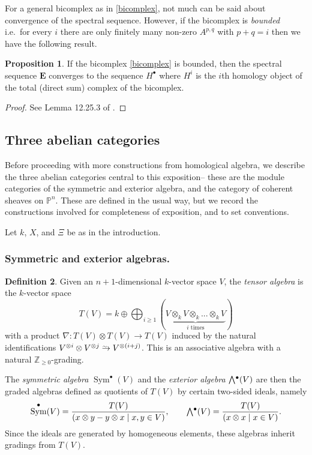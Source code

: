 \documentclass[a4paper]{article}
\theoremstyle{definition}
\newtheorem{defn}{Definition}[section]
\newtheorem{prop}[defn]{Proposition}
\theoremstyle{remark}
\newcommand{\simrightarrow}{\mathrel{\ooalign{
     $\to$\cr
     \hidewidth\raise.3em\hbox{$\scaleobj{.7}{\sim}\mkern7mu$}\cr
    }
  }
}
\newcommand{\Exter}{\mathchoice{{\textstyle\bigwedge}}%
    {{\bigwedge}}%
    {{\textstyle\wedge}}%
    {{\scriptstyle\wedge}}}
\DeclareMathOperator{\Sym}{\text{Sym}}
\DeclareMathOperator{\exterior}{\Exter^\bullet}
\newcommand{\Pn}{\ensuremath{{\mathbb{P}^n}}}
\begin{document}
For a general bicomplex as in \eqref{bicomplex}, not much can be said about
convergence of the spectral sequence. However, if the bicomplex is
\textit{bounded} i.e.\ for every \(i\) there are only finitely many non-zero
\(A^{p,q}\) with \(p+q=i\) then we have the following result.
\pagebreak

\begin{prop}\label{spectral-convergence}
    If the bicomplex \eqref{bicomplex} is bounded, then the spectral sequence
    \(\mathbf{E}\) converges to the sequence \(H^\bullet\) where \(H^i\) is the
    \(i\)th homology object of the total (direct sum) complex of the bicomplex.
    \begin{proof}
        See Lemma 12.25.3 of .
    \end{proof}
\end{prop}

\subsection{Three abelian categories}

Before proceeding with more constructions from homological algebra, we describe
the three abelian categories central to this exposition-- these are the module
categories of the symmetric and exterior algebra, and the category of coherent
sheaves on \(\Pn\). These are defined in the usual way, but we record the
constructions involved for completeness of exposition, and to set conventions. 

Let \(k\), \(X\), and \(\Xi\) be as in the introduction.

\subsubsection{Symmetric and exterior algebras.} 

\begin{defn} 
    Given an \(n+1\)-dimensional \(k\)-vector space \(V\), the \textit{tensor
    algebra} is the \(k\)-vector space 
    \[ T(V) = k \oplus \bigoplus_{i\geq 1}(\underbrace{V\otimes_k V\otimes_k ...
    \otimes_k V}_{i\text{ times}})\] 
    with a product \(\nabla: T(V)\otimes T(V) \rightarrow T(V)\) induced by the
    natural identifications \(V^{\otimes i}\otimes V^{\otimes j} \simrightarrow
    V^{\otimes(i+j)}\). This is an associative algebra with a natural
    \(\mathbb{Z}_{\geq 0}\)-grading. 

    The \textit{symmetric algebra} \(\Sym^\bullet(V)\) and the \textit{exterior
    algebra} \(\exterior(V)\) are then the graded algebras defined as quotients
    of \(T(V)\) by certain two-sided ideals, namely 
    \[\Sym^\bullet(V) = \frac{T(V)}{(x\otimes y - y\otimes x \;|\; x,y\in V)},
    \qquad \exterior(V) = \frac{T(V)}{(x\otimes x \;|\; x\in V)}.\] 
    Since the ideals are generated by homogeneous elements, these algebras
    inherit gradings from \(T(V)\).
\end{defn}
\end{document}

